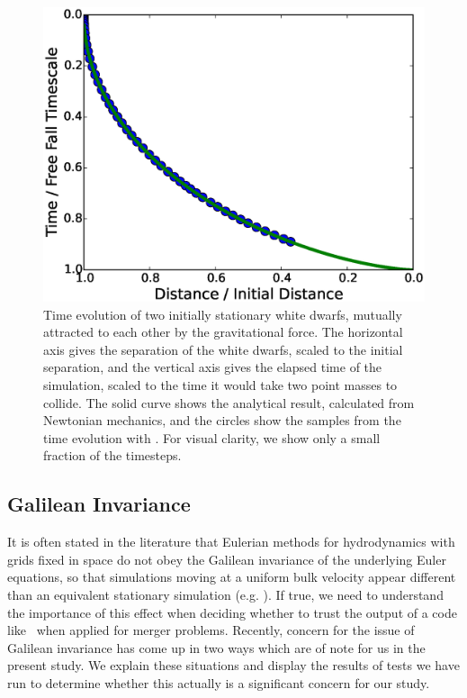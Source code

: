 \documentclass[12pt]{article}
\begin{document}
\begin{figure}[h!]
  \centering
  \includegraphics[scale=0.80,trim=0.3in 0.0in 0.8in 0.5in,clip]{plots/freefall}
  \caption[Gravitational free-fall test]
          {Time evolution of two initially stationary white dwarfs,
           mutually attracted to each other by the gravitational force. The
           horizontal axis gives the separation of the white dwarfs, scaled
           to the initial separation, and the vertical axis gives the elapsed
           time of the simulation, scaled to the time it would take two point masses
           to collide. The solid curve shows the analytical result,
           calculated from Newtonian mechanics, and the circles show the
           samples from the time evolution with \castro. For visual clarity, we 
           show only a small fraction of the timesteps.\label{fig:freefall}}
\end{figure}

\subsection{Galilean Invariance}
\label{sec:galileo}

It is often stated in the literature that Eulerian methods for
hydrodynamics with grids fixed in space do not obey the Galilean
invariance of the underlying Euler equations, so that simulations
moving at a uniform bulk velocity appear different than an
equivalent stationary simulation (e.g. \cite{arepo}). If true, we need to understand 
the importance of this effect when deciding whether to trust the 
output of a code like \castro\ when applied for merger problems.
Recently, concern for the issue of Galilean invariance has come up in two ways which are of note for us 
in the present study. We explain these situations and display 
the results of tests we have run to determine whether this 
actually is a significant concern for our study.
\end{document}
